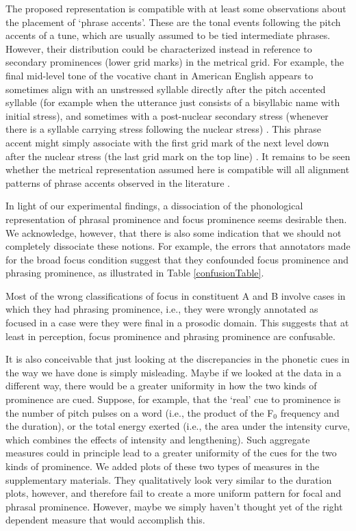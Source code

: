 \documentclass[preprint,review,12pt,authoryear,times]{elsarticle}
\begin{document}
The proposed representation is compatible with at least some observations about the placement of `phrase accents'. These are the tonal events following the pitch accents of a tune, which are usually assumed to be tied intermediate phrases. However, their distribution could be characterized instead in reference to secondary prominences (lower grid marks) in the metrical grid. For example, the final mid-level tone of the vocative chant in American English appears to sometimes align with an unstressed syllable directly after the pitch accented syllable (for example when the utterance just consists of a bisyllabic name with initial stress), and sometimes with a post-nuclear secondary stress (whenever there is a syllable carrying stress following the nuclear stress)  \citep[cf.][]{liber75,grice00}.  This phrase accent might simply associate with the first grid mark of the next level down after the nuclear stress (the last grid mark on the top line) \citep[see][153ff]{wagner05recursion}.  It remains to be seen whether the metrical representation assumed here is compatible will all alignment patterns of phrase accents observed in the literature \citep[e.g.][]{grice00}.

In light of our experimental findings, a dissociation of the phonological representation of phrasal prominence and focus prominence seems desirable then. We acknowledge, however, that there is also some indication that we should not completely dissociate these notions. For example, the errors that annotators made for the broad focus condition suggest that they confounded focus prominence and phrasing prominence, as illustrated in Table \ref{confusionTable}.

 

Most of the wrong classifications of focus in constituent A and B involve cases in which they had phrasing prominence, i.e., they were wrongly annotated as focused in a case were they were final in a prosodic domain. This suggests that at least in perception, focus prominence and phrasing prominence are confusable. 

It is also conceivable that just looking at the discrepancies in the phonetic cues in the way we have done is simply misleading. Maybe if we looked at the data in a different way, there would be a greater uniformity in how the two kinds of prominence are cued. Suppose, for example, that the `real' cue to prominence is the number of pitch pulses on a word (i.e., the product of the F$_0$  frequency and the duration), or the total energy exerted (i.e., the area under the intensity curve, which combines the effects of intensity and lengthening). Such aggregate measures could in principle lead to a greater uniformity of the cues for the two kinds of prominence. We added plots of these two types of measures in the supplementary materials. They qualitatively look very similar to the duration plots, however, and therefore fail to create a more uniform pattern for focal and phrasal prominence. However, maybe we simply haven't thought yet of the right dependent measure that would accomplish this.  
\end{document}
